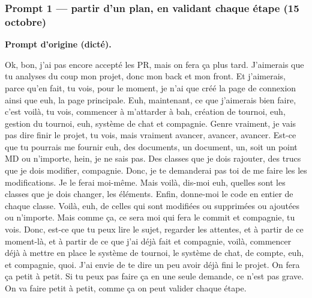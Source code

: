 \documentclass[11pt,a4paper]{article}
\begin{document}
\subsubsection*{Prompt 1 — partir d'un plan, en validant chaque étape (15 octobre)}

\begin{prompt}
\textbf{Prompt d'origine (dicté).}\par\vspace{0.3em}
Ok, bon, j'ai pas encore accepté les PR, mais on fera ça plus tard. J'aimerais que tu analyses du coup mon projet, donc mon back et mon front. Et j'aimerais, parce qu'en fait, tu vois, pour le moment, je n'ai que créé la page de connexion ainsi que euh, la page principale. Euh, maintenant, ce que j'aimerais bien faire, c'est voilà, tu vois, commencer à m'attarder à bah, création de tournoi, euh, gestion du tournoi, euh, système de chat et compagnie. Genre vraiment, je vais pas dire finir le projet, tu vois, mais vraiment avancer, avancer, avancer. Est-ce que tu pourrais me fournir euh, des documents, un document, un, soit un point MD ou n'importe, hein, je ne sais pas. Des classes que je dois rajouter, des trucs que je dois modifier, compagnie. Donc, je te demanderai pas toi de me faire les les modifications. Je le ferai moi-même. Mais voilà, dis-moi euh, quelles sont les classes que je dois changer, les éléments. Enfin, donne-moi le code en entier de chaque classe. Voilà, euh, de celles qui sont modifiées ou supprimées ou ajoutées ou n'importe. Mais comme ça, ce sera moi qui fera le commit et compagnie, tu vois. Donc, est-ce que tu peux lire le sujet, regarder les attentes, et à partir de ce moment-là, et à partir de ce que j'ai déjà fait et compagnie, voilà, commencer déjà à mettre en place le système de tournoi, le système de chat, de compte, euh, et compagnie, quoi. J'ai envie de te dire un peu avoir déjà fini le projet. On fera ça petit à petit. Si tu peux pas faire ça en une seule demande, ce n'est pas grave. On va faire petit à petit, comme ça on peut valider chaque étape.
\end{prompt}
\end{document}
